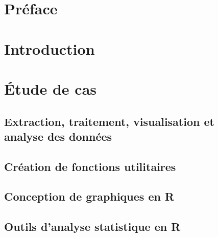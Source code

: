 \documentclass{report}
\newcommand*{\titlePage}{
	\begingroup 
		\hbox{
			\hspace*{0.1\textwidth}
			\rule{1.5pt}{\textheight}
			\hspace*{0.05\textwidth}
			\parbox[b]{0.75\textwidth}{
				{\noindent\LARGE\bfseries Étude de cas:} \\[\baselineskip]
				{\noindent\Huge\bfseries Analyse de marché du} \\
				{\noindent\Huge\bfseries transport aérien} \\
				{\noindent\Huge\bfseries canadien avec R} \\[2\baselineskip]
				{\large\textit{Atelier d'introduction à R}}\\[4\baselineskip]
				{\Large\textsc{Cabral Cruz, Samuel}} \\[2\baselineskip]
				{\large \normalfont{Avec la collaboration de}} \\[\baselineskip]
				{\large\textsc{Beauchemin, David}} \\[\baselineskip]
				{\large\textsc{Goulet, Vincent}} \\[4\baselineskip]
				{\large {Dans le cadre du colloque R à Québec}} \\[\baselineskip]
				{\large {25 mai 2017}} 
				\vspace{0.35\textheight}}}\endgroup}
\begin{document}
\renewcommand{\labelitemi}{\tiny $\blacktriangleright$}
\renewcommand{\labelitemii}{\footnotesize $\bullet$}
\renewcommand{\labelitemiii}{\tiny \ding{117}}
\renewcommand{\labelitemiv}{\small $\star$}

\begin{titlepage}
	\clearpage\thispagestyle{empty}
	\titlePage
\end{titlepage}
\newpage

\tableofcontents
\listoffigures
{}
\lstlistoflistings
{}
\listoftables
{}
\chapter*{Préface}
	

\chapter*{Introduction}
\setcounter{chapter}{1}
	

\chapter*{Étude de cas}
	
\section{Extraction, traitement, visualisation et \\analyse des données}
	

\newpage
\section{Création de fonctions utilitaires}
	\label{sec:fctUtil}
	

\newpage
\section{Conception de graphiques en R}
	

\section{Outils d'analyse statistique en R}
	\label{sec:statsTools}
	
\end{document}
